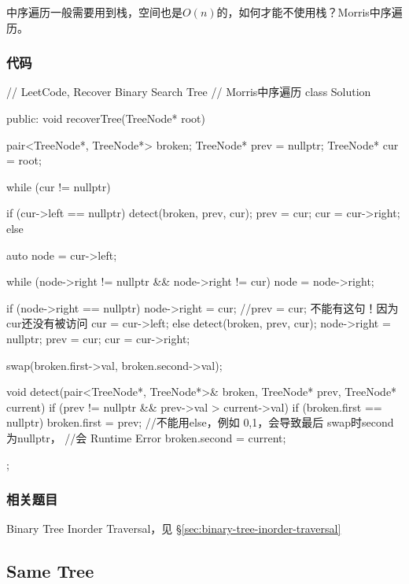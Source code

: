 中序遍历一般需要用到栈，空间也是$O(n)$的，如何才能不使用栈？Morris中序遍历。


\subsubsection{代码}

\begin{Code}
// LeetCode, Recover Binary Search Tree
// Morris中序遍历
class Solution {
public:
    void recoverTree(TreeNode* root) {
        pair<TreeNode*, TreeNode*> broken;
        TreeNode* prev = nullptr;
        TreeNode* cur = root;

        while (cur != nullptr) {
            if (cur->left == nullptr) {
                detect(broken, prev, cur);
                prev = cur;
                cur = cur->right;
            } else {
                auto node = cur->left;

                while (node->right != nullptr && node->right != cur)
                    node = node->right;

                if (node->right == nullptr) {
                    node->right = cur;
                    //prev = cur; 不能有这句！因为cur还没有被访问
                    cur = cur->left;
                } else {
                    detect(broken, prev, cur);
                    node->right = nullptr;
                    prev = cur;
                    cur = cur->right;
                }
            }
        }

        swap(broken.first->val, broken.second->val);
    }

    void detect(pair<TreeNode*, TreeNode*>& broken, TreeNode* prev,
            TreeNode* current) {
        if (prev != nullptr && prev->val > current->val) {
            if (broken.first == nullptr) {
                broken.first = prev;
            } //不能用else，例如 {0,1}，会导致最后 swap时second为nullptr，
              //会 Runtime Error
            broken.second = current;
        }
    }
};
\end{Code}


\subsubsection{相关题目}
\begindot
\item Binary Tree Inorder Traversal，见 \S \ref{sec:binary-tree-inorder-traversal}
\myenddot


\subsection{Same Tree}
\label{sec:same-tree}



